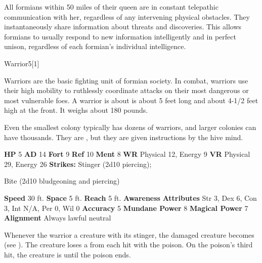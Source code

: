         All formians within 50 miles of their queen are in constant telepathic communication with her, regardless of any intervening physical obstacles.
        They instantaneously share information about threats and discoveries.
        This allows formians to usually respond to new information intelligently and in perfect unison, regardless of each formian's individual intelligence.
  

  \begin{monsubsection}{Warrior}{5}[1]
    \vspace{-1em}\vspace{-1em}
    \vspace{0em}

    
          Warriors are the basic fighting unit of formian society.
          In combat, warriors use their high mobility to ruthlessly coordinate attacks on their most dangerous or most vulnerable foes.
          A warrior is about is about 5 feet long and about 4-1/2 feet high at the front.
          It weighs about 180 pounds.
        
          Even the smallest colony typically has dozens of warriors, and larger colonies can have thousands.
          They are , but they are given instructions by the hive mind.
        

    \begin{spellcontent}
      \begin{spelltargetinginfo}
        \pari \textbf{HP} 5 \monsep
          \textbf{AD} 14 \monsep
          \textbf{Fort} 9 \monsep
          \textbf{Ref} 10 \monsep
          \textbf{Ment} 8
        \pari \textbf{WR} Physical 12, Energy 9 \monsep
        \textbf{VR} Physical 29, Energy 26
        \pari \textbf{Strikes:}
            Stinger  (2d10 piercing);
\par Bite  (2d10 bludgeoning and piercing)
      \end{spelltargetinginfo}
    \end{spellcontent}
    \begin{monsterfooter}
      \pari \textbf{Speed} 30 ft. \monsep
        \textbf{Space} 5 ft. \monsep
        \textbf{Reach} 5 ft.
      \pari \textbf{Awareness} 
      \pari \textbf{Attributes}
        Str 3, Dex 6,
        Con 3, Int N/A,
        Per 0, Wil 0
      \pari \textbf{Accuracy} 5 \monsep
        \textbf{Mundane Power} 8 \monsep
      \textbf{Magical Power} 7
      \pari \textbf{Alignment} Always lawful neutral
    \end{monsterfooter}
  \end{monsubsection}
            Whenever the warrior  a creature with its stinger, the damaged creature becomes  (see ).
            The creature loses a  from each hit with the poison.
            On the poison's third hit, the creature is  until the poison ends.
  
